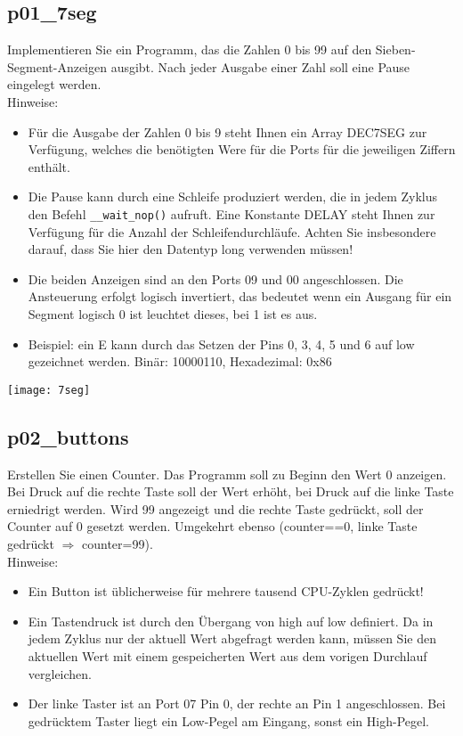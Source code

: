 \documentclass[
  accentcolor=tud1c,	%
  colorbacktitle,		%
  inverttitle,			%
  german,				%
  twoside
]{tudexercise}
\begin{document}
\subsection{p01\_7seg}
Implementieren Sie ein Programm, das die Zahlen 0 bis 99 auf den Sieben-Segment-Anzeigen ausgibt. Nach jeder Ausgabe einer Zahl soll eine Pause eingelegt werden.\\
Hinweise:\begin{itemize}
\item Für die Ausgabe der Zahlen 0 bis 9 steht Ihnen ein Array DEC7SEG zur Verfügung, welches die benötigten Were für die Ports für die jeweiligen Ziffern enthält.
\item Die Pause kann durch eine Schleife produziert werden, die in jedem Zyklus den Befehl \texttt{\_\_wait\_nop()} aufruft. Eine Konstante DELAY steht Ihnen zur Verfügung für die Anzahl der Schleifendurchläufe. Achten Sie insbesondere darauf, dass Sie hier den Datentyp long verwenden müssen!
\item Die beiden Anzeigen sind an den Ports 09 und 00 angeschlossen. Die Ansteuerung erfolgt logisch invertiert, das bedeutet wenn ein Ausgang für ein Segment logisch 0 ist leuchtet dieses, bei 1 ist es aus.
\item Beispiel: ein \glqq{}E\grqq{} kann durch das Setzen der Pins 0, 3, 4, 5 und 6 auf low gezeichnet werden. Binär: 10000110, Hexadezimal: 0x86
\end{itemize}
\begin{center}\texttt{[image: 7seg]}\end{center}

\subsection{p02\_buttons}
Erstellen Sie einen Counter. Das Programm soll zu Beginn den Wert 0 anzeigen. Bei Druck auf die rechte Taste soll der Wert erhöht, bei Druck auf die linke Taste erniedrigt werden. Wird 99 angezeigt und die rechte Taste gedrückt, soll der Counter auf 0 gesetzt werden. Umgekehrt ebenso (counter==0, linke Taste gedrückt $\Rightarrow$ counter=99).\\
Hinweise:\begin{itemize}
\item Ein Button ist üblicherweise für mehrere tausend CPU-Zyklen gedrückt!
\item Ein Tastendruck ist durch den Übergang von high auf low definiert. Da in jedem Zyklus nur der aktuell Wert abgefragt werden kann, müssen Sie den aktuellen Wert mit einem gespeicherten Wert aus dem vorigen Durchlauf vergleichen.
\item Der linke Taster ist an Port 07 Pin 0, der rechte an Pin 1 angeschlossen. Bei gedrücktem Taster liegt ein Low-Pegel am Eingang, sonst ein High-Pegel.
\end{itemize}
\end{document}
